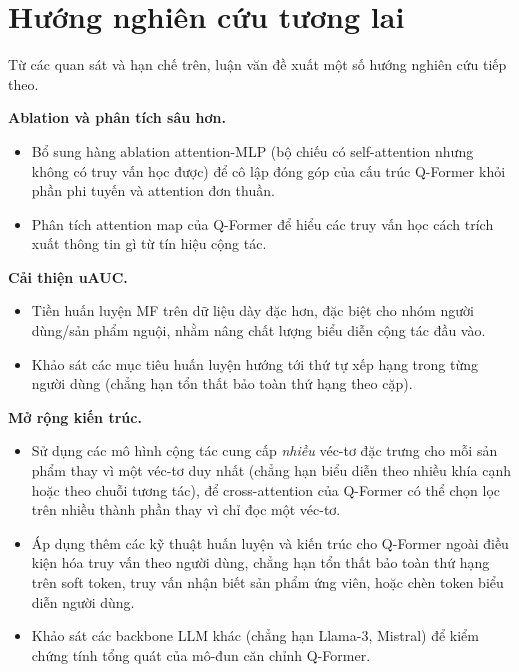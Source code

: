 \section{Hướng nghiên cứu tương lai}
\label{sec:huong-phat-trien}

Từ các quan sát và hạn chế trên, luận văn đề xuất một số hướng nghiên cứu tiếp theo.

\textbf{Ablation và phân tích sâu hơn.}
\begin{itemize}
    \item Bổ sung hàng ablation attention-MLP (bộ chiếu có self-attention nhưng không có truy
    vấn học được) để cô lập đóng góp của cấu trúc Q-Former khỏi phần phi tuyến và attention đơn
    thuần.
    \item Phân tích attention map của Q-Former để hiểu các truy vấn học cách trích xuất thông tin
    gì từ tín hiệu cộng tác.
\end{itemize}

\textbf{Cải thiện uAUC.}
\begin{itemize}
    \item Tiền huấn luyện MF trên dữ liệu dày đặc hơn, đặc biệt cho nhóm người dùng/sản phẩm
    nguội, nhằm nâng chất lượng biểu diễn cộng tác đầu vào.
    \item Khảo sát các mục tiêu huấn luyện hướng tới thứ tự xếp hạng trong từng người dùng (chẳng
    hạn tổn thất bảo toàn thứ hạng theo cặp).
\end{itemize}

\textbf{Mở rộng kiến trúc.}
\begin{itemize}
    \item Sử dụng các mô hình cộng tác cung cấp \textit{nhiều} véc-tơ đặc trưng cho mỗi sản phẩm
    thay vì một véc-tơ duy nhất (chẳng hạn biểu diễn theo nhiều khía cạnh hoặc theo chuỗi tương
    tác), để cross-attention của Q-Former có thể chọn lọc trên nhiều thành phần thay vì chỉ đọc
    một véc-tơ.
    \item Áp dụng thêm các kỹ thuật huấn luyện và kiến trúc cho Q-Former ngoài điều kiện hóa truy
    vấn theo người dùng, chẳng hạn tổn thất bảo toàn thứ hạng trên soft token, truy vấn nhận biết
    sản phẩm ứng viên, hoặc chèn token biểu diễn người dùng.
    \item Khảo sát các backbone LLM khác (chẳng hạn Llama-3, Mistral) để kiểm chứng tính tổng
    quát của mô-đun căn chỉnh Q-Former.
\end{itemize}
